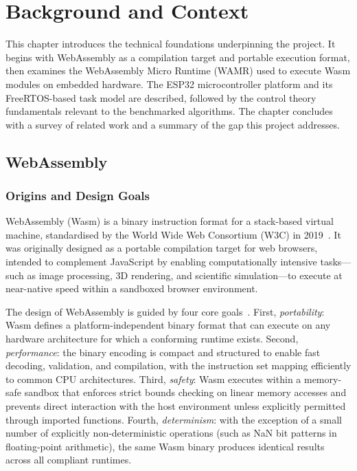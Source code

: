 \documentclass[12pt, a4paper]{report}
\begin{document}
\chapter{Background and Context}
\label{ch:background}

This chapter introduces the technical foundations underpinning the project. It begins with WebAssembly as a compilation target and portable execution format, then examines the WebAssembly Micro Runtime (WAMR) used to execute Wasm modules on embedded hardware. The ESP32 microcontroller platform and its FreeRTOS-based task model are described, followed by the control theory fundamentals relevant to the benchmarked algorithms. The chapter concludes with a survey of related work and a summary of the gap this project addresses.

\section{WebAssembly}
\label{sec:wasm}

\subsection{Origins and Design Goals}
\label{subsec:wasm-origins}

WebAssembly (Wasm) is a binary instruction format for a stack-based virtual machine, standardised by the World Wide Web Consortium (W3C) in 2019~\cite{wasm-spec}. It was originally designed as a portable compilation target for web browsers, intended to complement JavaScript by enabling computationally intensive tasks---such as image processing, 3D rendering, and scientific simulation---to execute at near-native speed within a sandboxed browser environment.

The design of WebAssembly is guided by four core goals~\cite{haas2017bringing}. First, \textit{portability}: Wasm defines a platform-independent binary format that can execute on any hardware architecture for which a conforming runtime exists. Second, \textit{performance}: the binary encoding is compact and structured to enable fast decoding, validation, and compilation, with the instruction set mapping efficiently to common CPU architectures. Third, \textit{safety}: Wasm executes within a memory-safe sandbox that enforces strict bounds checking on linear memory accesses and prevents direct interaction with the host environment unless explicitly permitted through imported functions. Fourth, \textit{determinism}: with the exception of a small number of explicitly non-deterministic operations (such as NaN bit patterns in floating-point arithmetic), the same Wasm binary produces identical results across all compliant runtimes.
\end{document}
